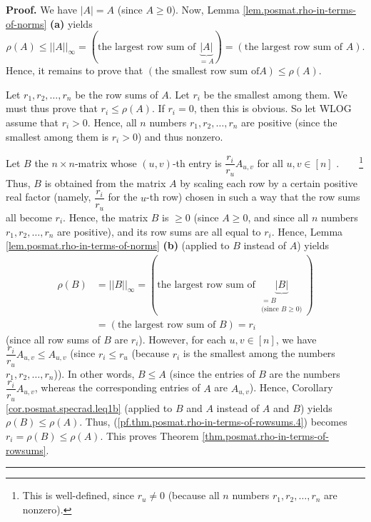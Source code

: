 \documentclass[numbers=enddot,12pt,final,onecolumn,notitlepage]{scrartcl}%
\numberwithin{exer}{subsection}
\theoremstyle{definition}
\newenvironment{proof}[1][Proof]{\noindent\textbf{#1.} }{\ \rule{0.5em}{0.5em}}
\begin{document}
\begin{proof}
We have $\left\vert A\right\vert =A$ (since $A\geq0$). Now, Lemma
\ref{lem.posmat.rho-in-terms-of-norms} \textbf{(a)} yields%
\[
\rho\left(  A\right)  \leq\left\vert \left\vert A\right\vert \right\vert
_{\infty}=\left(  \text{the largest row sum of }\underbrace{\left\vert
A\right\vert }_{=A}\right)  =\left(  \text{the largest row sum of }A\right)
.
\]
Hence, it remains to prove that $\left(  \text{the smallest row sum of
}A\right)  \leq\rho\left(  A\right)  $.

Let $r_{1},r_{2},\ldots,r_{n}$ be the row sums of $A$. Let $r_{i}$ be the
smallest among them. We must thus prove that $r_{i}\leq\rho\left(  A\right)
$. If $r_{i}=0$, then this is obvious. So let WLOG assume that $r_{i}>0$.
Hence, all $n$ numbers $r_{1},r_{2},\ldots,r_{n}$ are positive (since the
smallest among them is $r_{i}>0$) and thus nonzero.

Let $B$ the $n\times n$-matrix whose $\left(  u,v\right)  $-th entry is
$\dfrac{r_{i}}{r_{u}}A_{u,v}$ for all $u,v\in\left[  n\right]  $%
.\ \ \ \ \footnote{This is well-defined, since $r_{u}\neq0$ (because all $n$
numbers $r_{1},r_{2},\ldots,r_{n}$ are nonzero).} Thus, $B$ is obtained from
the matrix $A$ by scaling each row by a certain positive real factor (namely,
$\dfrac{r_{i}}{r_{u}}$ for the $u$-th row) chosen in such a way that the row
sums all become $r_{i}$. Hence, the matrix $B$ is $\geq0$ (since $A\geq0$, and
since all $n$ numbers $r_{1},r_{2},\ldots,r_{n}$ are positive), and its row
sums are all equal to $r_{i}$. Hence, Lemma
\ref{lem.posmat.rho-in-terms-of-norms} \textbf{(b)} (applied to $B$ instead of
$A$) yields
\begin{align}
\rho\left(  B\right)   &  =\left\vert \left\vert B\right\vert \right\vert
_{\infty}=\left(  \text{the largest row sum of }\underbrace{\left\vert
B\right\vert }_{\substack{=B\\\text{(since }B\geq0\text{)}}}\right)
\nonumber\\
&  =\left(  \text{the largest row sum of }B\right)  =r_{i}
\label{pf.thm.posmat.rho-in-terms-of-rowsums.4}%
\end{align}
(since all row sums of $B$ are $r_{i}$). However, for each $u,v\in\left[
n\right]  $, we have $\dfrac{r_{i}}{r_{u}}A_{u,v}\leq A_{u,v}$ (since
$r_{i}\leq r_{u}$ (because $r_{i}$ is the smallest among the numbers
$r_{1},r_{2},\ldots,r_{n}$)). In other words, $B\leq A$ (since the entries of
$B$ are the numbers $\dfrac{r_{i}}{r_{u}}A_{u,v}$, whereas the corresponding
entries of $A$ are $A_{u,v}$). Hence, Corollary \ref{cor.posmat.specrad.leq1b}
(applied to $B$ and $A$ instead of $A$ and $B$) yields $\rho\left(  B\right)
\leq\rho\left(  A\right)  $. Thus,
(\ref{pf.thm.posmat.rho-in-terms-of-rowsums.4}) becomes $r_{i}=\rho\left(
B\right)  \leq\rho\left(  A\right)  $. This proves Theorem
\ref{thm.posmat.rho-in-terms-of-rowsums}.
\end{proof}
\end{document}
